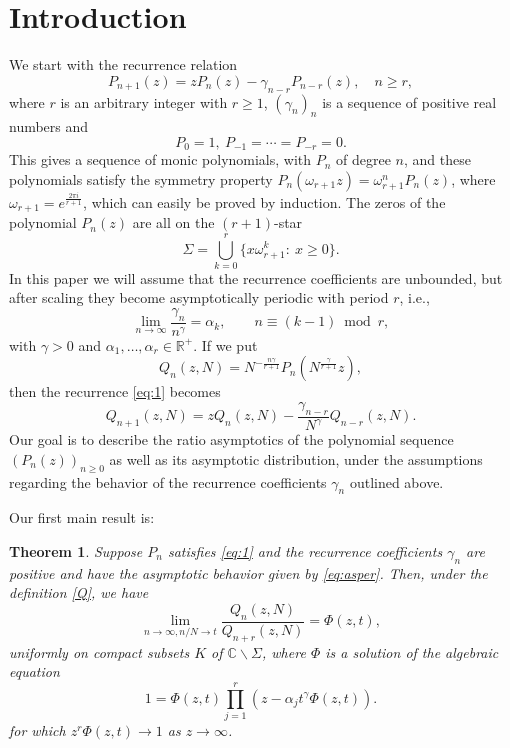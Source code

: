 \documentclass[12pt]{article}
\newtheorem{theorem}{Theorem}[section]
\numberwithin{equation}{section}
\begin{document}
\section{Introduction}
We start with the recurrence relation
\begin{equation}  \label{eq:1}
   P_{n+1}(z) = zP_n(z) - \gamma_{n-r} P_{n-r}(z), \quad n\geq r, 
\end{equation}
where $r$ is an arbitrary integer with $r\geq 1$,  $(\gamma_n)_n$ is a sequence of positive real numbers and 
\begin{equation}\label{eq:1b}
P_0=1,\  P_{-1} = \cdots = P_{-r}=0 .
\end{equation} This gives a sequence
of monic polynomials, with $P_n$ of degree $n$, and these polynomials satisfy the symmetry property $P_n(\omega_{r+1} z) = \omega_{r+1}^n P_n(z)$, where $\omega_{r+1}=e^{\frac{2\pi i}{r+1}}$, which can easily be proved by induction. The zeros of the polynomial $P_n(z)$ are all on the $(r+1)$-star 
\begin{equation} \label{Sigma}
\Sigma = \bigcup_{k=0}^r \{ x \omega_{r+1}^k:\  x \geq 0\}.  
\end{equation}
In this paper we will assume that the recurrence coefficients are unbounded, but after scaling they become asymptotically periodic with period $r$, i.e.,
\begin{equation}   \label{eq:asper}
      \lim_{n \to \infty}  \frac{\gamma_n}{n^\gamma} = \alpha_k, \qquad  n \equiv (k-1) \bmod r,
\end{equation} 
with $\gamma >0$ and $\alpha_1,\ldots,\alpha_r \in \mathbb{R}^+$. If we put 
\begin{equation}\label{Q}
	Q_n(z,N) = N^{-\frac{n\gamma}{r+1}} P_n(N^{\frac{\gamma}{r+1}} z),
\end{equation}
then the recurrence \eqref{eq:1} becomes
\begin{equation}  \label{eq:2}
   Q_{n+1}(z,N) = zQ_n(z,N) - \frac{\gamma_{n-r}}{N^\gamma} Q_{n-r}(z,N).
\end{equation}
Our goal is to describe the ratio asymptotics of the polynomial sequence \((P_n(z))_{n\geq 0}\) as well as its asymptotic distribution, under the assumptions regarding the behavior of the recurrence coefficients \(\gamma_n\) outlined above.  


Our first main result is:


\begin{theorem}\label{Thm1} Suppose $P_n$ satisfies \eqref{eq:1} and the recurrence coefficients $\gamma_n$ are positive and have the asymptotic behavior given by \eqref{eq:asper}. Then, under the definition \eqref{Q}, we have 
\begin{equation}  \label{eq:ratio}
   \lim_{n \to \infty, n/N \to t} \frac{Q_n(z,N)}{Q_{n+r}(z,N)} = \Phi(z,t),
\end{equation}
uniformly on compact subsets $K$ of $ \mathbb{C}\backslash \Sigma$, where $\Phi$ is a solution of the algebraic equation 
\begin{equation}  \label{eq:6}
	1=\Phi(z,t) \prod_{j=1}^{r}\left(z-\alpha_j t^\gamma \Phi(z,t)\right).
\end{equation}
for which $z^r\Phi(z,t) \to 1$ as $z \to \infty$.
\end{theorem}
\end{document}
